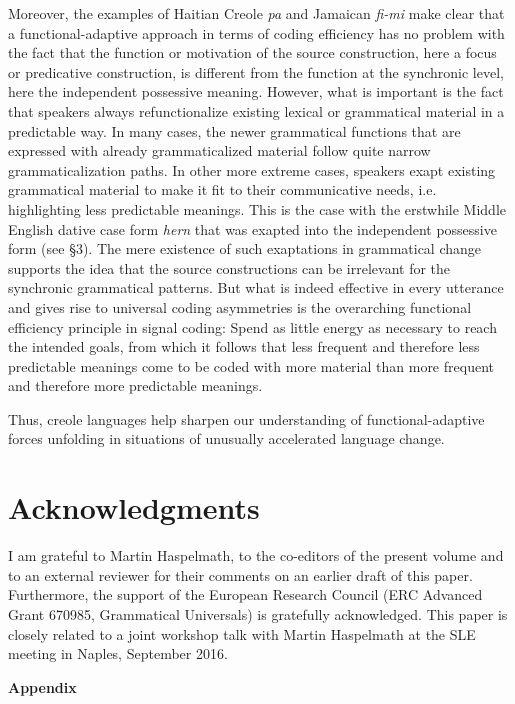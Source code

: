 \documentclass[output=paper]{langsci/langscibook}
\begin{document}
Moreover, the examples of Haitian Creole \textit{pa} and Jamaican \textit{fi-mi} make clear that a functional-adaptive approach in terms of coding efficiency has no problem with the fact that the function or motivation of the source construction, here a focus or predicative construction, is different from the function at the synchronic level, here the independent possessive meaning. However, what is important is the fact that speakers always refunctionalize existing lexical or grammatical material in a predictable way. In many cases, the newer grammatical functions that are expressed with already grammaticalized material follow quite narrow grammaticalization paths. In other more extreme cases, speakers exapt existing grammatical material to make it fit to their communicative needs, i.e. highlighting less predictable meanings. This is the case with the erstwhile Middle English dative case form \textit{hern} that was exapted into the independent possessive form (see §3). The mere existence of such exaptations in grammatical change supports the idea that the source constructions can be irrelevant for the synchronic grammatical patterns. But what is indeed effective in every utterance and gives rise to universal coding asymmetries is the overarching functional efficiency principle in signal coding: Spend as little energy as necessary to reach the intended goals, from which it follows that less frequent and therefore less predictable meanings come to be coded with more material than more frequent and therefore more predictable meanings.

Thus, creole languages help sharpen our understanding of functional-adaptive forces unfolding in situations of unusually accelerated language change.

\section*{Acknowledgments}

I am grateful to Martin Haspelmath, to the co-editors of the present volume and to an external reviewer for their comments on an earlier draft of this paper. Furthermore, the support of the European Research Council (ERC Advanced Grant 670985, Grammatical Universals) is gratefully acknowledged. This paper is closely related to a joint workshop talk with Martin Haspelmath at the SLE meeting in Naples,  {September 2016}.

\textbf{Appendix}
\end{document}
